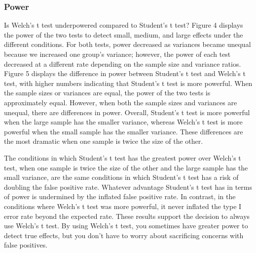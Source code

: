 \documentclass[man,a4paper,noextraspace,apacite]{apa6}
\begin{document}
\subsubsection{Power}



    Is Welch's t test underpowered compared to Student's t test? Figure 4 
displays the power of the two tests to detect small, medium, and large effects 
under the different conditions. For both tests, power decreased as variances 
became unequal because we increased one group's variance; however, the power of 
each test decreased at a different rate depending on the sample size and 
variance ratios. Figure 5 displays the difference in power between Student's t 
test and Welch's t test, with higher numbers indicating that Student's t test 
is more powerful. When the sample sizes or variances are equal, the power of 
the two tests is approximately equal. However, when both the sample sizes and 
variances are unequal, there are differences in power. Overall, Student's t 
test is more powerful when the large sample has the smaller variance, whereas 
Welch's t test is more powerful when the small sample has the smaller variance. 
These differences are the most dramatic when one sample is twice the size of 
the other. 
    
    The conditions in which Student's t test has the greatest power over 
Welch's t test, when one sample is twice the size of the other and the large 
sample has the small variance, are the same conditions in which Student's t 
test has a risk of doubling the false positive rate. Whatever advantage 
Student's t test has in terms of power is undermined by the inflated false 
positive rate. In contrast, in the conditions where Welch's t test was more 
powerful, it never inflated the type I error rate beyond the expected rate. 
These results support the decision to always use Welch's t test. By using 
Welch's t test, you sometimes have greater power to detect true effects, but 
you don't have to worry about sacrificing concerns with false positives.  
\end{document}
